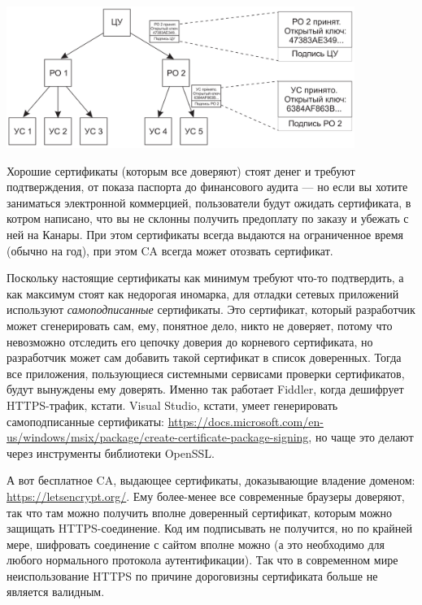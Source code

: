\documentclass{../mcstext}
\begin{document}
\begin{center}
    \includegraphics[width=0.85\textwidth]{certHierarchy.png}
\end{center}

Хорошие сертификаты (которым все доверяют) стоят денег и требуют подтверждения, от показа паспорта до финансового аудита --- но если вы хотите заниматься электронной коммерцией, пользователи будут ожидать сертификата, в котром написано, что вы не склонны получить предоплату по заказу и убежать с ней на Канары. При этом сертификаты всегда выдаются на ограниченное время (обычно на год), при этом CA всегда может отозвать сертификат.

Поскольку настоящие сертификаты как минимум требуют что-то подтвердить, а как максимум стоят как недорогая иномарка, для отладки сетевых приложений используют \textit{самоподписанные} сертификаты. Это сертификат, который разработчик может сгенерировать сам, ему, понятное дело, никто не доверяет, потому что невозможно отследить его цепочку доверия до корневого сертификата, но разработчик может сам добавить такой сертификат в список доверенных. Тогда все приложения, пользующиеся системными сервисами проверки сертификатов, будут вынуждены ему доверять. Именно так работает Fiddler, когда дешифрует HTTPS-трафик, кстати. Visual Studio, кстати, умеет генерировать самоподписанные сертификаты: \url{https://docs.microsoft.com/en-us/windows/msix/package/create-certificate-package-signing}, но чаще это делают через инструменты библиотеки OpenSSL. 

А вот бесплатное CA, выдающее сертификаты, доказывающие владение доменом: \url{https://letsencrypt.org/}. Ему более-менее все современные браузеры доверяют, так что там можно получить вполне доверенный сертификат, которым можно защищать HTTPS-соединение. Код им подписывать не получится, но по крайней мере, шифровать соединение с сайтом вполне можно (а это необходимо для любого нормального протокола аутентификации). Так что в современном мире неиспользование HTTPS по причине дороговизны сертификата больше не является валидным.
\end{document}
